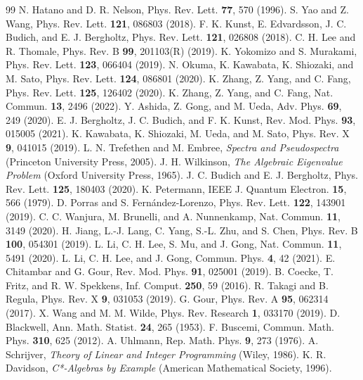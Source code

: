 \documentclass[11pt]{article}
\theoremstyle{definition}
\theoremstyle{remark}
\begin{document}
\begin{thebibliography}{99}
 N. Hatano and D. R. Nelson, Phys. Rev. Lett. \textbf{77}, 570 (1996).
 S. Yao and Z. Wang, Phys. Rev. Lett. \textbf{121}, 086803 (2018).
 F. K. Kunst, E. Edvardsson, J. C. Budich, and E. J. Bergholtz, Phys. Rev. Lett. \textbf{121}, 026808 (2018).
 C. H. Lee and R. Thomale, Phys. Rev. B \textbf{99}, 201103(R) (2019).
 K. Yokomizo and S. Murakami, Phys. Rev. Lett. \textbf{123}, 066404 (2019).
 N. Okuma, K. Kawabata, K. Shiozaki, and M. Sato, Phys. Rev. Lett. \textbf{124}, 086801 (2020).
 K. Zhang, Z. Yang, and C. Fang, Phys. Rev. Lett. \textbf{125}, 126402 (2020).
 K. Zhang, Z. Yang, and C. Fang, Nat. Commun. \textbf{13}, 2496 (2022).
 Y. Ashida, Z. Gong, and M. Ueda, Adv. Phys. \textbf{69}, 249 (2020).
 E. J. Bergholtz, J. C. Budich, and F. K. Kunst, Rev. Mod. Phys. \textbf{93}, 015005 (2021).
 K. Kawabata, K. Shiozaki, M. Ueda, and M. Sato, Phys. Rev. X \textbf{9}, 041015 (2019).
 L. N. Trefethen and M. Embree, \emph{Spectra and Pseudospectra} (Princeton University Press, 2005).
 J. H. Wilkinson, \emph{The Algebraic Eigenvalue Problem} (Oxford University Press, 1965).
 J. C. Budich and E. J. Bergholtz, Phys. Rev. Lett. \textbf{125}, 180403 (2020).
 K. Petermann, IEEE J. Quantum Electron. \textbf{15}, 566 (1979).
 D. Porras and S. Fern\'andez-Lorenzo, Phys. Rev. Lett. \textbf{122}, 143901 (2019).
 C. C. Wanjura, M. Brunelli, and A. Nunnenkamp, Nat. Commun. \textbf{11}, 3149 (2020).
 H. Jiang, L.-J. Lang, C. Yang, S.-L. Zhu, and S. Chen, Phys. Rev. B \textbf{100}, 054301 (2019).
 L. Li, C. H. Lee, S. Mu, and J. Gong, Nat. Commun. \textbf{11}, 5491 (2020).
 L. Li, C. H. Lee, and J. Gong, Commun. Phys. \textbf{4}, 42 (2021).
 E. Chitambar and G. Gour, Rev. Mod. Phys. \textbf{91}, 025001 (2019).
 B. Coecke, T. Fritz, and R. W. Spekkens, Inf. Comput. \textbf{250}, 59 (2016).
 R. Takagi and B. Regula, Phys. Rev. X \textbf{9}, 031053 (2019).
 G. Gour, Phys. Rev. A \textbf{95}, 062314 (2017).
 X. Wang and M. M. Wilde, Phys. Rev. Research \textbf{1}, 033170 (2019).
 D. Blackwell, Ann. Math. Statist. \textbf{24}, 265 (1953).
 F. Buscemi, Commun. Math. Phys. \textbf{310}, 625 (2012).
 A. Uhlmann, Rep. Math. Phys. \textbf{9}, 273 (1976).
 A. Schrijver, \emph{Theory of Linear and Integer Programming} (Wiley, 1986).
 K. R. Davidson, \emph{C*-Algebras by Example} (American Mathematical Society, 1996).
\end{thebibliography}
\end{document}
